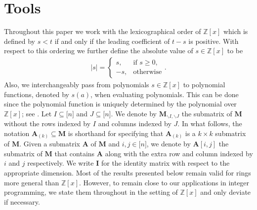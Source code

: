 \documentclass[a4paper, 11pt]{article}
\newcommand{\Z}{\mathbb{Z}}
\newcommand{\bA}{\bm{A}}
\newcommand{\bM}{\bm{M}}
\newcommand{\indet}{x}
\newcommand{\polyring}{\Z[\indet]}
\newcommand{\id}{\bm{I}}
\begin{document}
	\section{Tools}\label{sec_tools}
	Throughout this paper we work with the lexicographical order of $\polyring$ which is defined by $s < t$ if and only if the leading coefficient of $t - s$ is positive. With respect to this ordering we further define the absolute value of $s\in \polyring$ to be
	\begin{align*}
		|s| = \begin{cases}
			s, & \text{if }s \geq 0,\\
			-s, & \text{otherwise} 
		\end{cases}.
	\end{align*}
	Also, we interchangeably pass from polynomials $s\in \polyring$ to polynomial functions, denoted by $s(a)$, when evaluating polynomials. This can be done since the polynomial function is uniquely determined by the polynomial over $\polyring$; see \cite[Chapter~4]{langalgebra}. 
	Let $I\subseteq \lbrack n\rbrack$ and $J \subseteq \lbrack n\rbrack$. We denote by $\bM_{\backslash I,\backslash J}$ the submatrix of $\bM$ without the rows indexed by $I$ and columns indexed by $J$. In what follows, the notation $\bA_{(k)}\subseteq\bM$ is shorthand for specifying that $\bA_{(k)}$ is a $k\times k$ submatrix of $\bM$. 
	Given a submatrix $\bA$ of $\bM$ and $i,j\in\lbrack n\rbrack$, we denote by $\bA[i,j]$ the submatrix of $\bM$ that contains $\bA$ along with the extra row and column indexed by $i$ and $j$ respectively. We write $\id$ for the identity matrix with respect to the appropriate dimension. Most of the results presented below remain valid for rings more general than $\polyring$. However, to remain close to our applications in integer programming, we state them throughout in the setting of $\polyring$ and only deviate if necessary.
	
\end{document}
